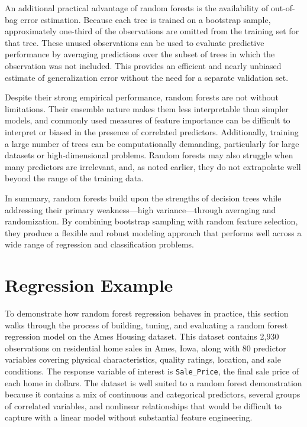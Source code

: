 \documentclass[
  11pt,
  letterpaper,
]{article}
\begin{document}
An additional practical advantage of random forests is the availability
of out-of-bag error estimation. Because each tree is trained on a
bootstrap sample, approximately one-third of the observations are
omitted from the training set for that tree. These unused observations
can be used to evaluate predictive performance by averaging predictions
over the subset of trees in which the observation was not included. This
provides an efficient and nearly unbiased estimate of generalization
error without the need for a separate validation set.

Despite their strong empirical performance, random forests are not
without limitations. Their ensemble nature makes them less interpretable
than simpler models, and commonly used measures of feature importance
can be difficult to interpret or biased in the presence of correlated
predictors. Additionally, training a large number of trees can be
computationally demanding, particularly for large datasets or
high-dimensional problems. Random forests may also struggle when many
predictors are irrelevant, and, as noted earlier, they do not
extrapolate well beyond the range of the training data.

In summary, random forests build upon the strengths of decision trees
while addressing their primary weakness---high variance---through
averaging and randomization. By combining bootstrap sampling with random
feature selection, they produce a flexible and robust modeling approach
that performs well across a wide range of regression and classification
problems.

\section{Regression Example}\label{regression-example}

To demonstrate how random forest regression behaves in practice, this
section walks through the process of building, tuning, and evaluating a
random forest regression model on the Ames Housing dataset. This dataset
contains 2,930 observations on residential home sales in Ames, Iowa,
along with 80 predictor variables covering physical characteristics,
quality ratings, location, and sale conditions. The response variable of
interest is \texttt{Sale\_Price}, the final sale price of each home in
dollars. The dataset is well suited to a random forest demonstration
because it contains a mix of continuous and categorical predictors,
several groups of correlated variables, and nonlinear relationships that
would be difficult to capture with a linear model without substantial
feature engineering.
\end{document}
